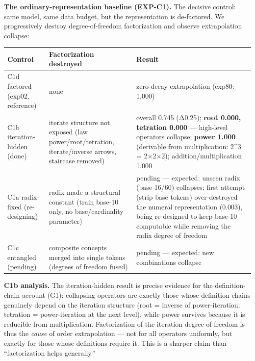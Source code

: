 \documentclass[
]{article}
\begin{document}
\textbf{The ordinary-representation baseline (EXP-C1).} The decisive
control: same model, same data budget, but the representation is
de-factored. We progressively destroy degree-of-freedom factorization
and observe extrapolation collapse:

\begin{longtable}[]{@{}
  >{\raggedright\arraybackslash}p{}
  >{\raggedright\arraybackslash}p{}
  >{\raggedright\arraybackslash}p{}@{}}
\toprule\noalign{}
\begin{minipage}[b]{\linewidth}\raggedright
Control
\end{minipage} & \begin{minipage}[b]{\linewidth}\raggedright
Factorization destroyed
\end{minipage} & \begin{minipage}[b]{\linewidth}\raggedright
Result
\end{minipage} \\
\midrule\noalign{}
\endhead
\bottomrule\noalign{}
\endlastfoot
C1d factored (exp02, reference) & none & zero-decay extrapolation
(exp80: 1.000) \\
C1b iteration-hidden (done) & iterate structure not exposed (law
power/root/tetration, iterate/inverse arrows, staircase removed) &
overall 0.745 (Δ0.25); \textbf{root 0.000, tetration 0.000} ---
high-level operators collapse; \textbf{power 1.000} (derivable from
multiplication: 2\^{}3 = 2×2×2); addition/multiplication 1.000 \\
C1a radix-fixed (re-designing) & radix made a structural constant (train
base-10 only, no base/cardinality parameter) & pending --- expected:
unseen radix (base 16/60) collapses; first attempt (strip base tokens)
over-destroyed the numeral representation (0.003), being re-designed to
keep base-10 computable while removing the radix degree of freedom \\
C1c entangled (pending) & composite concepts merged into single tokens
(degrees of freedom fused) & pending --- expected: new combinations
collapse \\
\end{longtable}

\textbf{C1b analysis.} The iteration-hidden result is precise evidence
for the definition-chain account (G1): collapsing operators are exactly
those whose definition chains genuinely depend on the iteration
structure (root = inverse of power-iteration; tetration =
power-iteration at the next level), while power survives because it is
reducible from multiplication. Factorization of the iteration degree of
freedom is thus the \emph{cause} of order extrapolation --- not for all
operators uniformly, but exactly for those whose definitions require it.
This is a sharper claim than ``factorization helps generally.''
\end{document}
